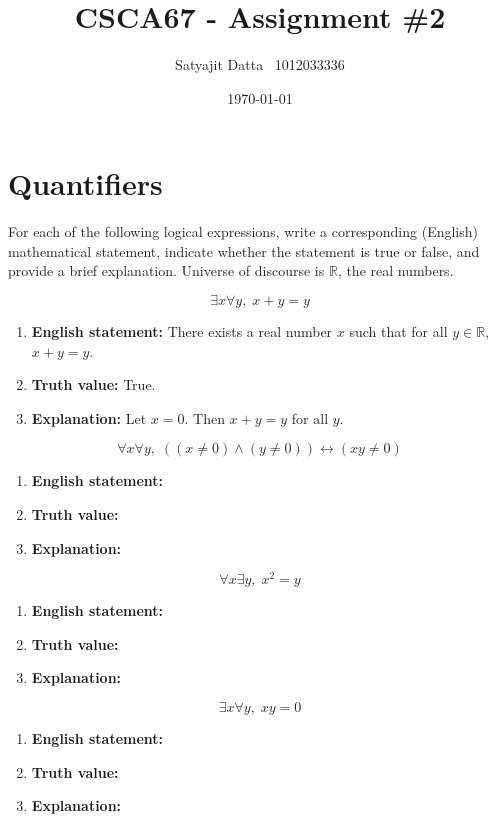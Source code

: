 \documentclass[]{article}
\title{\textbf{CSCA67 - Assignment \#2}}
\author{Satyajit Datta \ 1012033336}
\date{\today}
\begin{document}
\maketitle

\section{Quantifiers}
For each of the following logical expressions, write a corresponding (English) mathematical statement, indicate
whether the statement is true or false, and provide a brief explanation. Universe of discourse is $\mathbb{R}$, the real numbers.

\begin{question}{1.1}
\[
\exists x \forall y,\; x + y = y
\]
\end{question}
\begin{enumerate}[label=(\alph*)]
    \item \textbf{English statement:} There exists a real number $x$ such that for all $y \in \mathbb{R}$, $x + y = y$.
    \item \textbf{Truth value:} True.
    \item \textbf{Explanation:} Let $x = 0$. Then $x + y = y$ for all $y$.
\end{enumerate}

\begin{question}{1.2}
\[
\forall x\forall y,\;((x \ne 0) \land (y \ne 0)) \leftrightarrow (xy \ne 0)
\]
\end{question}
\begin{enumerate}[label=(\alph*)]
    \item \textbf{English statement:}
    \item \textbf{Truth value:}
    \item \textbf{Explanation:}
\end{enumerate}

\begin{question}{1.3}
\[
\forall x\exists y,\; x^2 = y
\]
\end{question}
\begin{enumerate}[label=(\alph*)]
    \item \textbf{English statement:}
    \item \textbf{Truth value:}
    \item \textbf{Explanation:}
\end{enumerate}

\begin{question}{1.4}
\[
\exists x\forall y,\; xy = 0
\]
\end{question}
\begin{enumerate}[label=(\alph*)]
    \item \textbf{English statement:}
    \item \textbf{Truth value:}
    \item \textbf{Explanation:}
\end{enumerate}
\end{document}
